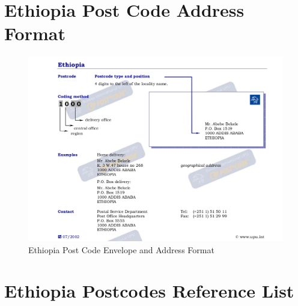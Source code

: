 \begin{appendices}
\section{Ethiopia Post Code Address Format}
\begin{figure}[!h]
\includegraphics[width=15cm,keepaspectratio]{images/ethio_postcode_addressing}
\caption{Ethiopia Post Code Envelope and Address Format}
\end{figure}

\section{Ethiopia Postcodes Reference List}




\end{appendices}